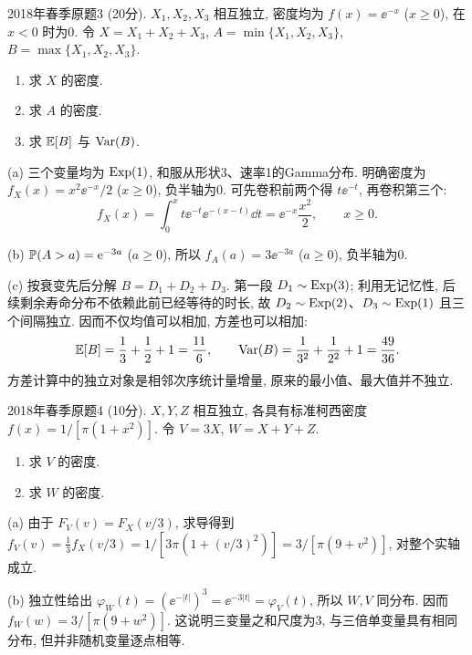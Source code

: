 \begin{exercise}\label{m2:2018s:q3}
2018年春季原题3 (20分). $X_1,X_2,X_3$ 相互独立, 密度均为 $f(x)=\ee^{-x}$ ($x\ge0$), 在 $x<0$ 时为0. 令 $X=X_1+X_2+X_3$, $A=\min\{X_1,X_2,X_3\}$, $B=\max\{X_1,X_2,X_3\}$.
\begin{enumerate}
\item[(a)]\label{m2:2018s:q3:a} 求 $X$ 的密度.
\item[(b)]\label{m2:2018s:q3:b} 求 $A$ 的密度.
\item[(c)]\label{m2:2018s:q3:c} 求 $\mathbb E[B]$ 与 $\operatorname{Var}(B)$.
\end{enumerate}
\end{exercise}
\begin{solution}
(a) 三个变量均为 $\operatorname{Exp}(1)$, 和服从形状3、速率1的Gamma分布. 明确密度为 $f_X(x)=x^2\ee^{-x}/2$ ($x\ge0$), 负半轴为0. 可先卷积前两个得 $t\ee^{-t}$, 再卷积第三个:
\[
f_X(x)=\int_0^x t\ee^{-t}\ee^{-(x-t)}\dd t=\ee^{-x}\frac{x^2}2,\qquad x\ge0.
\]

(b) $\mathbb P(A>a)=\mathrm e^{-3a}$ ($a\ge0$), 所以 $f_A(a)=3\ee^{-3a}$ ($a\ge0$), 负半轴为0.

(c) 按衰变先后分解 $B=D_1+D_2+D_3$. 第一段 $D_1\sim\operatorname{Exp}(3)$; 利用无记忆性, 后续剩余寿命分布不依赖此前已经等待的时长, 故 $D_2\sim\operatorname{Exp}(2)$、$D_3\sim\operatorname{Exp}(1)$ 且三个间隔独立. 因而不仅均值可以相加, 方差也可以相加:
\[
\mathbb E[B]=\frac13+\frac12+1=\frac{11}6,\qquad
\operatorname{Var}(B)=\frac1{3^2}+\frac1{2^2}+1=\frac{49}{36}.
\]
方差计算中的独立对象是相邻次序统计量增量, 原来的最小值、最大值并不独立.
\end{solution}

\begin{exercise}\label{m2:2018s:q4}
2018年春季原题4 (10分). $X,Y,Z$ 相互独立, 各具有标准柯西密度 $f(x)=1/[\pi(1+x^2)]$. 令 $V=3X$, $W=X+Y+Z$.
\begin{enumerate}
\item[(a)]\label{m2:2018s:q4:a} 求 $V$ 的密度.
\item[(b)]\label{m2:2018s:q4:b} 求 $W$ 的密度.
\end{enumerate}
\end{exercise}
\begin{solution}
(a) 由于 $F_V(v)=F_X(v/3)$, 求导得到 $f_V(v)=\frac13f_X(v/3)=1/[3\pi(1+(v/3)^2)]=3/[\pi(9+v^2)]$, 对整个实轴成立.

(b) 独立性给出 $\varphi_W(t)=(\ee^{-|t|})^3=\ee^{-3|t|}=\varphi_V(t)$, 所以 $W,V$ 同分布. 因而 $f_W(w)=3/[\pi(9+w^2)]$. 这说明三变量之和尺度为3, 与三倍单变量具有相同分布, 但并非随机变量逐点相等.
\end{solution}

